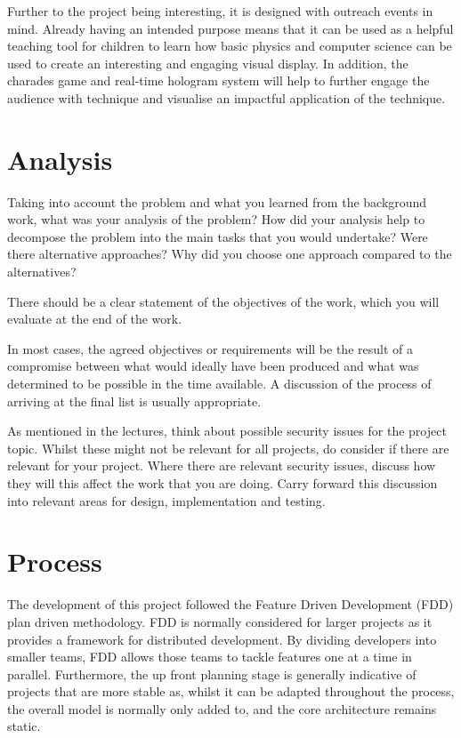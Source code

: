 Further to the project being interesting, it is designed with outreach events in mind. Already having an intended purpose means that it can be used as a helpful teaching tool for children to learn how basic physics and computer science can be used to create an interesting and engaging visual display. In addition, the charades game and real-time hologram system will help to further engage the audience with technique and visualise an impactful application of the technique. 

\section{Analysis}
Taking into account the problem and what you learned from the background work, what was your analysis of the problem? How did your analysis help to decompose the problem into the main tasks that you would undertake? Were there alternative approaches? Why did you choose one approach compared to the alternatives? 

There should be a clear statement of the objectives of the work, which you will evaluate at the end of the work. 

In most cases, the agreed objectives or requirements will be the result of a compromise between what would ideally have been produced and what was determined to be possible in the time available. A discussion of the process of arriving at the final list is usually appropriate.

As mentioned in the lectures, think about possible security issues for the project topic. Whilst these might not be relevant for all projects, do consider if there are relevant for your project. Where there are relevant security issues, discuss how they will this affect the work that you are doing. Carry forward this discussion into relevant areas for design, implementation and testing.



\section{Process}
The development of this project followed the Feature Driven Development (FDD) plan driven methodology. FDD is normally considered for larger projects as it provides a framework for distributed development. By dividing developers into smaller teams, FDD allows those teams to tackle features one at a time in parallel. Furthermore, the up front planning stage is generally indicative of projects that are more stable as, whilst it can be adapted throughout the process, the overall model is normally only added to, and the core architecture remains static.


